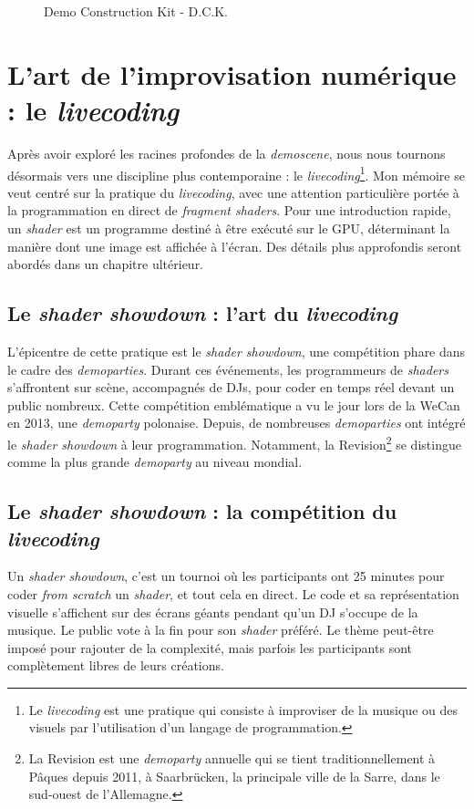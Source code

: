 \begin{figure}[h]
\begin{minipage}[b]{0.30\linewidth}
  \end{minipage}
  \caption{Demo Construction Kit - D.C.K.}
  \label{dck}
\end{figure}


\section{L'art de l'improvisation numérique : le \textit{livecoding}}

Après avoir exploré les racines profondes de la \textit{demoscene}, nous nous tournons désormais vers une discipline plus contemporaine : le \textit{livecoding}\footnote{Le \textit{livecoding} est une pratique qui consiste à improviser de la musique ou des visuels par l'utilisation d'un langage de programmation.}. Mon mémoire se veut centré sur la pratique du \textit{livecoding}, avec une attention particulière portée à la programmation en direct de \textit{fragment shaders}. Pour une introduction rapide, un \textit{shader} est un programme destiné à être exécuté sur le GPU, déterminant la manière dont une image est affichée à l'écran. Des détails plus approfondis seront abordés dans un chapitre ultérieur.

\subsection*{Le \textit{shader showdown} : l'art du \textit{livecoding}}

L'épicentre de cette pratique est le \textit{shader showdown}, une compétition phare dans le cadre des \textit{demoparties}. Durant ces événements, les programmeurs de \textit{shaders} s'affrontent sur scène, accompagnés de DJs, pour coder en temps réel devant un public nombreux. Cette compétition emblématique a vu le jour lors de la WeCan en 2013, une \textit{demoparty} polonaise. Depuis, de nombreuses \textit{demoparties} ont intégré le \textit{shader showdown} à leur programmation. Notamment, la Revision\footnote{La Revision est une \textit{demoparty} annuelle qui se tient traditionnellement à Pâques depuis 2011, à Saarbrücken, la principale ville de la Sarre, dans le sud-ouest de l'Allemagne.} se distingue comme la plus grande \textit{demoparty} au niveau mondial.

\subsection*{Le \textit{shader showdown} : la compétition du \textit{livecoding}}
Un \textit{shader showdown}, c’est un tournoi où les participants ont 25 minutes pour coder \textit{from scratch} un \textit{shader}, et tout cela en direct. Le code et sa représentation visuelle s’affichent sur des écrans géants pendant qu’un DJ s’occupe de la musique. Le public vote à la fin pour son \textit{shader} préféré. Le thème peut-être imposé pour rajouter de la complexité, mais parfois les participants sont complètement libres de leurs créations.

